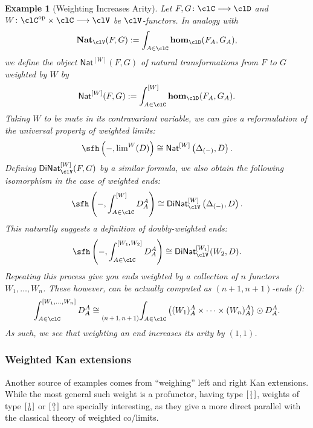 \documentclass[11pt]{amsart}
\newcommand{\wlim}[1]{\mathrm{lim}^{#1}}
\newcommand{\ph}{\mathsf{h}}
\newcommand{\DiNat}{\mathrm{DiNat}}
\newcommand{\eHom}{\textbf{hom}}
\def\defeq{:=}
\newcommand*{\Scale}[2][4]{\scalebox{#1}{\ensuremath{#2}}}%
\newcommand{\VNat}[1]{\mathbf{Nat}_{#1}}
\newcommand{\wNat}[1]{\mathsf{Nat}^{[#1]}}
\newcommand{\wDiNat}[1]{\mathsf{DiNat}^{[#1]}}
\newcommand{\wVDiNat}[2]{\mathsf{DiNat}^{[#1]}_{#2}}
\newcommand{\pqEnd}[3]{\mathop{\prescript{}{\Scale[.75]{\raisebox{.25em}{$(#1,#2)$}}}{\int_{#3}}}}
\def\ph{\sfh}
\newtheorem{example}{Example}
\def\op{\text{op}}
\begin{document}
\begin{example}[Weighting Increases Arity]
	Let $F,G\colon\clC\longrightarrow\clD$ and $W\colon\clC^{\op}\times\clC\longrightarrow\clV$ be $\clV$-functors. In analogy with
	\[
		\VNat{\clV}(F,G)
		\defeq
		\int_{A\in\clC}\eHom_{\clD}(F_{A},G_{A}),
	\]
	we define the \emph{object $\wNat{W}(F,G)$ of natural transformations from $F$ to $G$ weighted by $W$} by
	\begin{equation}\label{object-wnat-w-f-g-of-natural-transformations-from-f-to-g-weighted-by-w}
		\wNat{W}(F,G)
		\defeq
		\wEnd[W]{A\in\clC}\eHom_{\clD}(F_{A},G_{A}).
	\end{equation}
	Taking $W$ to be mute in its contravariant variable, we can give a reformulation of the universal property of weighted limits:
	\[
		\ph\left(-,\wlim{W}(D)\right)
		\cong
		\wNat{W}\left(\Delta_{(-)},D\right).
	\]
	Defining $\wVDiNat{W}{\clV}(F,G)$ by a similar formula, we also obtain the following isomorphism in the case of weighted ends:
	\[
		\ph\left(-,\wEnd[W]{A\in\clC}D^{A}_{A}\right)
		\cong
		\wVDiNat{W}{\clV}\left(\Delta_{(-)},D\right).
	\]
	This naturally suggests a definition of \emph{doubly-weighted ends}:
	\[
		\ph\left(-,\wEnd[W_{1},W_{2}]{A\in\clC}D^{A}_{A}\right)
		\cong
		\wVDiNat{W_{1}}{\clV}(W_{2},D).
	\]
	Repeating this process give you ends weighted by a collection of $n$ functors $W_{1},\ldots,W_{n}$. These however, can be actually computed as $(n+1,n+1)$-ends (\cite{weighend}):
	\[
		\int_{A\in\clC}^{[W_{1},\ldots,W_{n}]}D^{A}_{A}
		\cong
		\pqEnd{n+1}{n+1}{A\in\clC}\left((W_{1})^{A}_{A}\times\cdots\times(W_{n})^{A}_{A}\right)\odot D^{A}_{A}.
	\]
	As such, we see that weighting an end increases its arity by $(1,1)$.
\end{example}
\subsubsection{Weighted Kan extensions}\label{weikan}
Another source of examples comes from ``weighing'' left and right Kan extensions. While the most general such weight is a profunctor, having type $\typepq{1}{1}$, weights of type $\typepq{1}{0}$ or $\typepq{0}{1}$ are specially interesting, as they give a more direct parallel with the classical theory of weighted co/limits.
\end{document}
